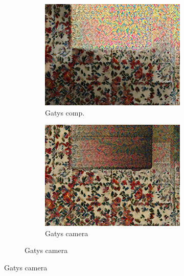 \begin{figure}[]
\begin{subfigure}{\textwidth}
\begin{subfigure}{0.24\textwidth}
        \end{subfigure}
        \hfill
        \begin{subfigure}{0.24\textwidth}
            \centering
            \includegraphics[width=\textwidth]{images/04-experiment02/carpet/flowers/gatys_im.jpg}
            \caption*{Gatys comp.}
        \end{subfigure}
        \hfill
        \begin{subfigure}{0.24\textwidth}
            \centering
            \includegraphics[width=\textwidth]{images/04-experiment02/carpet/flowers/gatys_proj.jpg}
            \caption*{Gatys camera}
        \end{subfigure}
        

\end{subfigure}
\end{figure}
